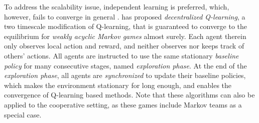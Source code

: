

To address  the scalability issue, independent learning is preferred, which, however, fails to converge in general  \cite{tan1993multi}.      \cite{arslan2017decentralized} has proposed  \emph{decentralized Q-learning}, a two
timescale modification of Q-learning, that is guaranteed to converge to the equilibrium  for \emph{weakly acyclic Markov games} almost surely. Each agent therein only  observes local action and reward, and neither observes nor  keeps track of others' actions.  
All agents are instructed to use the same  stationary \emph{baseline policy} for many consecutive stages, named \emph{exploration phase}. At the end of the \emph{exploration phase}, all agents are \emph{synchronized} to update their baseline policies, which makes the environment stationary for long enough, and enables the convergence of Q-learning based methods.  
Note that these algorithms can also be applied  to the cooperative setting, as these games include Markov teams as a special case. 

